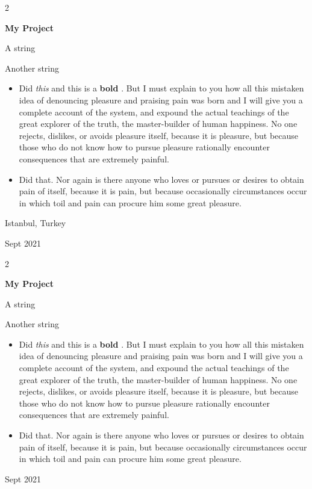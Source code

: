 \documentclass[10pt, letterpaper]{article}
\newenvironment{summary}{
    \begin{description}[
        topsep=0.10 cm,
        parsep=0.10 cm,
        partopsep=0pt,
        itemsep=0pt,
        leftmargin=0.4 cm + 10pt
    ]
}{
    \end{description}
} %
\newenvironment{highlights}{
    \begin{itemize}[
        topsep=0.10 cm,
        parsep=0.10 cm,
        partopsep=0pt,
        itemsep=0pt,
        leftmargin=0.4 cm + 10pt
    ]
}{
    \end{itemize}
} %
\newenvironment{twocolentry}[2][]{
    \onecolentry
    \def\secondColumn{#2}
    \setcolumnwidth{\fill, 4.5 cm}
    \begin{paracol}{2}
}{
    \switchcolumn \raggedleft \secondColumn
    \end{paracol}
    \endonecolentry
} %
\let\hrefWithoutArrow\href
\renewcommand{\href}[2]{\hrefWithoutArrow{#1}{\ifthenelse{\equal{#2}{}}{ }{#2 }\raisebox{.15ex}{\footnotesize \faExternalLink*}}}
\begin{document}
        \vspace{0.2 cm}

        \begin{twocolentry}{
            Istanbul, Turkey

        Sept 2021
        }
            \textbf{My Project}
            \begin{summary}
                \item A string
                \item Another string
            \end{summary}
            \begin{highlights}
                \item Did \textit{this} and this is a \textbf{bold} \href{https://example.com}{link}. But I must explain to you how all this mistaken idea of denouncing pleasure and praising pain was born and I will give you a complete account of the system, and expound the actual teachings of the great explorer of the truth, the master-builder of human happiness. No one rejects, dislikes, or avoids pleasure itself, because it is pleasure, but because those who do not know how to pursue pleasure rationally encounter consequences that are extremely painful.
                \item Did that. Nor again is there anyone who loves or pursues or desires to obtain pain of itself, because it is pain, but because occasionally circumstances occur in which toil and pain can procure him some great pleasure.
            \end{highlights}
        \end{twocolentry}


        \vspace{0.2 cm}

        \begin{twocolentry}{
            Sept 2021
        }
            \textbf{My Project}
            \begin{summary}
                \item A string
                \item Another string
            \end{summary}
            \begin{highlights}
                \item Did \textit{this} and this is a \textbf{bold} \href{https://example.com}{link}. But I must explain to you how all this mistaken idea of denouncing pleasure and praising pain was born and I will give you a complete account of the system, and expound the actual teachings of the great explorer of the truth, the master-builder of human happiness. No one rejects, dislikes, or avoids pleasure itself, because it is pleasure, but because those who do not know how to pursue pleasure rationally encounter consequences that are extremely painful.
                \item Did that. Nor again is there anyone who loves or pursues or desires to obtain pain of itself, because it is pain, but because occasionally circumstances occur in which toil and pain can procure him some great pleasure.
            \end{highlights}
        \end{twocolentry}
\end{document}
